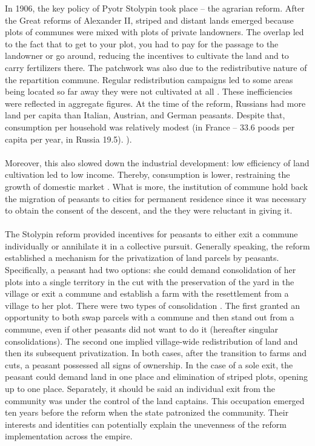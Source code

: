 \documentclass[a4paper, 12pt]{article}
\begin{document}
In 1906, the key policy of Pyotr Stolypin took place -- the agrarian reform. After the Great reforms of Alexander II, striped and distant lands emerged because plots of communes were mixed with plots of private landowners. The overlap led to the fact that to get to your plot, you had to pay for the passage to the landowner or go around, reducing the incentives to cultivate the land and to carry fertilizers there. The patchwork was also due to the redistributive nature of the repartition commune. Regular redistribution campaigns led to some areas being located so far away they were not cultivated at all \parencite{davydov}. These inefficiencies were reflected in aggregate figures. At the time of the reform, Russians had more land per capita than Italian, Austrian, and German peasants. Despite that, consumption per household was relatively modest (in France -- 33.6 poods per capita per year, in Russia 19.5). \cite{nefyodov}).
\\\\
Moreover, this also slowed down the industrial development: low efficiency of land cultivation led to low income. Thereby, consumption is lower, restraining the growth of domestic market \parencite{litoshenko}. What is more, the institution of commune hold back the migration of peasants to cities for permanent residence since it was necessary to obtain the consent of the descent, and the they were reluctant in giving it.
\\\\
The Stolypin reform provided incentives for peasants to either exit a commune individually or annihilate it in a collective pursuit. Generally speaking, the reform established a mechanism for the privatization of land parcels by peasants. Specifically, a peasant had two options: she could demand consolidation of her plots into a single territory in the cut with the preservation of the yard in the village or exit a commune and establish a farm with the resettlement from a village to her plot. There were two types of consolidation \parencite{castaneda2019stolypin}. The first  granted an opportunity to both swap parcels with a commune and then stand out from a commune, even if other peasants did not want to do it (hereafter singular consolidations). The second one implied village-wide redistribution of land and then its subsequent privatization. In both cases, after the transition to farms and cuts, a peasant possessed all signs of ownership. In the case of a sole exit, the peasant could demand land in one place and elimination of striped plots, opening up to one place. Separately, it should be said an individual exit from the community was under the control of the land captains. This occupation emerged ten years before the reform when the state patronized the community. Their interests and identities can potentially explain the unevenness of the reform implementation across the empire. 
\end{document}
